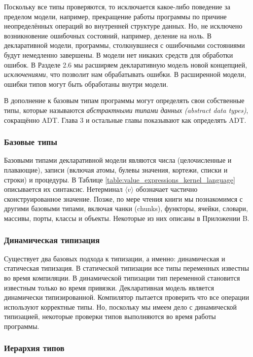 Поскольку все типы проверяются, то исключается какое-либо поведение за пределом модели, например, прекращение работы программы по причине неопределённых операций во внутренней структуре данных. Но, не исключено возникновение ошибочных состояний, например, деление на ноль. В декларативной модели, программы, столкнувшиеся с ошибочными состояниями будут немедленно завершены. В модели нет никаких средств для обработки ошибок. В Разделе 2.6 мы расширяем декларативную модель новой концепцией, \emph{исключениями}, что позволит нам обрабатывать ошибки. В расширенной модели, ошибки типов могут быть обработаны внутри модели.

В дополнение к базовым типам программы могут определять свои собственные типы, которые называются \emph{абстрактными типами данных (abstract data types)}, сокращённо ADT. Глава 3 и остальные главы показывают как определять ADT.

\subsubsection{Базовые типы}

Базовыми типами декларативной модели являются числа (целочисленные и плавающие), записи (включая атомы, булевы значения, кортежи, списки и строки) и процедуры. В Таблице \ref{table:value_expressions_kernel_language} описывается их синтаксис. Нетерминал $\langle v \rangle$ обозначает частично сконструированное значение. Позже, по мере чтения книги мы познакомимся с другими базовыми типами, включая чанки (chunks), функторы, ячейки, словари, массивы, порты, классы и объекты. Некоторые из них описаны в Приложении B.

\subsubsection{Динамическая типизация}

Существует два базовых подхода к типизации, а именно: динамическая и статическая типизация. В статической типизации все типы переменных известны во время компиляции. В динамической типизации тип переменной становится известным только во время привязки. Декларативная модель является динамически типизированной. Компилятор пытается проверить что все операции используют корректные типы. Но, поскольку мы имеем дело с динамической типизацией, некоторые проверки типов выполняются во время работы программы.

\subsubsection{Иерархия типов}

